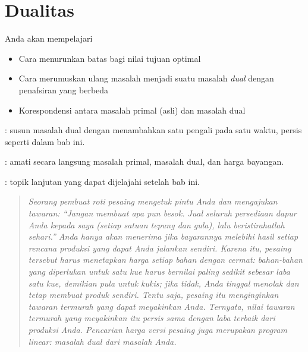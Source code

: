 

\chapter{Dualitas}
\label{ch:duality}

\begin{outcome}
Anda akan mempelajari
\begin{itemize}
\item Cara menurunkan batas bagi nilai tujuan optimal
\item Cara merumuskan ulang masalah menjadi suatu masalah \emph{dual} dengan penafsiran yang berbeda
\item Korespondensi antara masalah primal (asli) dan masalah dual
\end{itemize}
\end{outcome}

\begin{tryit}
: susun masalah dual dengan menambahkan satu pengali pada satu waktu, persis seperti dalam bab ini.

: amati secara langsung masalah primal, masalah dual, dan harga bayangan.

: topik lanjutan yang dapat dijelajahi setelah bab ini.
\end{tryit}



\begin{quote}
\itshape Seorang pembuat roti pesaing mengetuk pintu Anda dan mengajukan tawaran: ``Jangan membuat apa pun besok. Jual seluruh persediaan dapur Anda kepada saya (setiap satuan tepung dan gula), lalu beristirahatlah sehari.'' Anda hanya akan menerima jika bayarannya melebihi hasil setiap rencana produksi yang dapat Anda jalankan sendiri. Karena itu, pesaing tersebut harus menetapkan harga setiap bahan dengan cermat: bahan-bahan yang diperlukan untuk satu kue harus bernilai paling sedikit sebesar laba satu kue, demikian pula untuk kukis; jika tidak, Anda tinggal menolak dan tetap membuat produk sendiri. Tentu saja, pesaing itu menginginkan tawaran termurah yang dapat meyakinkan Anda. Ternyata, nilai tawaran termurah yang meyakinkan itu \emph{persis} sama dengan laba terbaik dari produksi Anda. Pencarian harga versi pesaing juga merupakan program linear: masalah \emph{dual} dari masalah Anda.
\end{quote}

